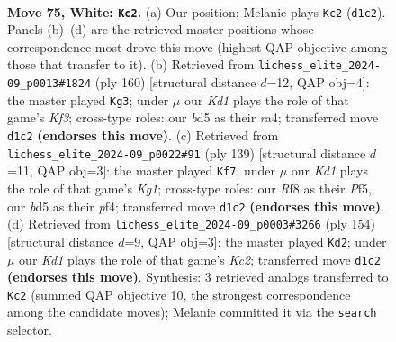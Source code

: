 \documentclass[11pt]{article}
\begin{document}
\clearpage

\begin{figure}[p]\centering
\begin{subfigure}{0.46\textwidth}\centering
\resizebox{\linewidth}{!}{%
\newchessgame
\chessboard[
  setfen={5R2/7r/3k4/3b4/1P6/8/8/3KR3 w - - 23 75},
  showmover=false,
  pgfstyle=straightmove, color=movearrow, markmove={d1-c2}
]}
\caption{}
\end{subfigure}\hfill
\begin{subfigure}{0.46\textwidth}\centering
\resizebox{\linewidth}{!}{%
\newchessgame
\chessboard[
  setfen={8/8/3k4/5P2/r7/4RK2/8/8 w - - 7 81},
  showmover=false,
  pgfstyle=straightmove, color=movearrow, markmove={f3-g3}
]}
\caption{}
\end{subfigure}
\\[4pt]
\begin{subfigure}{0.46\textwidth}\centering
\resizebox{\linewidth}{!}{%
\newchessgame
\chessboard[
  setfen={6kr/8/8/5p2/5P2/6K1/8/1R6 b - - 9 70},
  showmover=false,
  pgfstyle=straightmove, color=movearrow, markmove={g8-f7}
]}
\caption{}
\end{subfigure}\hfill
\begin{subfigure}{0.46\textwidth}\centering
\resizebox{\linewidth}{!}{%
\newchessgame
\chessboard[
  setfen={8/8/8/8/2bk4/8/1RK5/4r3 w - - 54 78},
  showmover=false,
  pgfstyle=straightmove, color=movearrow, markmove={c2-d2}
]}
\caption{}
\end{subfigure}
\caption{\textbf{Move 75, White: \texttt{Kc2}.} (a) Our position; Melanie plays \texttt{Kc2} (\texttt{d1c2}). Panels (b)--(d) are the retrieved master positions whose correspondence most drove this move (highest QAP objective among those that transfer to it). (b) Retrieved from \texttt{lichess\_elite\_2024-09\_p0013\#1824} (ply 160) [structural distance $d$=12, QAP obj=4]: the master played \texttt{Kg3}; under $\mu$ our \emph{Kd1} plays the role of that game's \emph{Kf3}; cross-type roles: our \emph{b}d5 as their \emph{r}a4; transferred move \texttt{d1c2} \textbf{(endorses this move)}. (c) Retrieved from \texttt{lichess\_elite\_2024-09\_p0022\#91} (ply 139) [structural distance $d$=11, QAP obj=3]: the master played \texttt{Kf7}; under $\mu$ our \emph{Kd1} plays the role of that game's \emph{Kg1}; cross-type roles: our \emph{R}f8 as their \emph{P}f5, our \emph{b}d5 as their \emph{p}f4; transferred move \texttt{d1c2} \textbf{(endorses this move)}. (d) Retrieved from \texttt{lichess\_elite\_2024-09\_p0003\#3266} (ply 154) [structural distance $d$=9, QAP obj=3]: the master played \texttt{Kd2}; under $\mu$ our \emph{Kd1} plays the role of that game's \emph{Kc2}; transferred move \texttt{d1c2} \textbf{(endorses this move)}. Synthesis: 3 retrieved analogs transferred to \texttt{Kc2} (summed QAP objective 10, the strongest correspondence among the candidate moves); Melanie committed it via the \texttt{search} selector.}
\label{fig:thought-m148}
\end{figure}
\end{document}
